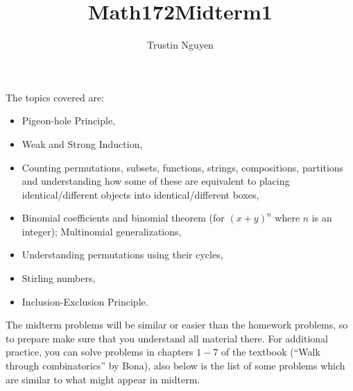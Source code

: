 \documentclass{article}
\title{Math172Midterm1}
\author{Trustin Nguyen}
\begin{document}
    \maketitle

\reversemarginpar

The topics covered are:
    \begin{itemize}
        \item Pigeon-hole Principle,

        \item Weak and Strong Induction,

        \item Counting permutations, subsets, functions, strings, compositions, partitions and understanding how some of these are equivalent to placing identical/different objects into identical/different boxes,

        \item Binomial coefficients and binomial theorem (for $(x + y)^{n}$ where $n$ is an integer); Multinomial generalizations,

        \item Understanding permutations using their cycles,

        \item Stirling numbers,

        \item Inclusion-Exclusion Principle. 
    \end{itemize}

The midterm problems will be similar or easier than the homework problems, so to prepare make sure that you understand all material there. For additional practice, you can solve problems in chapters $1 - 7$ of the textbook (``Walk through combinatorics'' by Bona), also below is the list of some problems which are similar to what might appear in midterm.
\end{document}
